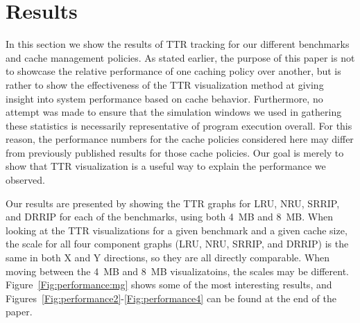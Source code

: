 \section{Results}

In this section we show the results of TTR tracking for our different
benchmarks and cache management policies.  
As stated earlier, the purpose of this paper is not to showcase the relative
performance of one caching policy over another, but is rather to show
the effectiveness of the TTR visualization method at giving
insight into system performance based on cache behavior.
Furthermore, no attempt was made to ensure that the simulation windows
we used in gathering these statistics is necessarily representative of
program execution overall.  
For this reason, the performance numbers for the cache policies considered 
here may differ from previously published results for those cache policies.
Our goal is merely to show that TTR
visualization is a useful way to explain the performance we observed.

Our results are presented by showing the TTR graphs for LRU, NRU,
SRRIP, and DRRIP for each of the benchmarks, using both 4~MB and
8~MB.  
When looking at the TTR visualizations for a given
benchmark and a given cache size, the scale for all four component
graphs (LRU, NRU, SRRIP, and DRRIP) is the same in both X and Y
directions, so they are all directly comparable.  When moving between
the 4~MB and 8~MB visualizatoins, the scales may be different.
Figure~\ref{Fig:performance:mg} shows some of the most interesting 
results, and Figures~\ref{Fig:performance2}-\ref{Fig:performance4} 
can be found at the end of the paper.


\begin{figure*}
  \centerline{
  }
  \centerline{
  }
  \centerline{
  }
\caption{Time to Recache}
\label{Fig:performance:mg}
\end{figure*}
